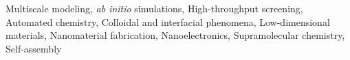 
\begin{cvparagraph}
  Multiscale modeling, \textit{ab initio} simulations,
  High-throughput screening, Automated chemistry, Colloidal and
  interfacial phenomena, Low-dimensional materials, Nanomaterial
  fabrication, Nanoelectronics, Supramolecular chemistry, Self-assembly
\end{cvparagraph}

